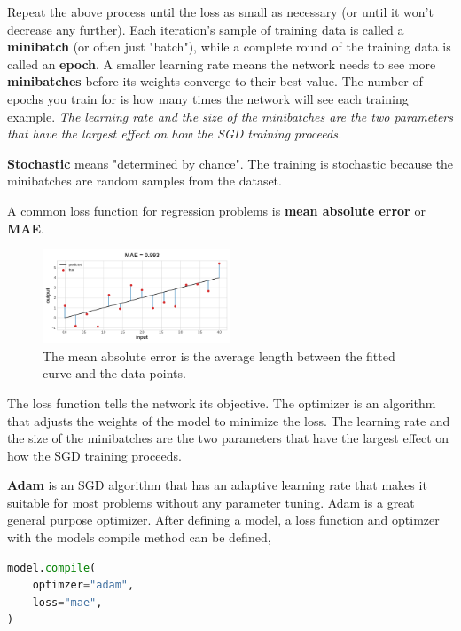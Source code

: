 \noindent Repeat the above process until the loss as small as necessary (or until
it won't decrease any further). Each iteration's sample of training data is called
a \textbf{minibatch} (or often just "batch"), while a complete round of the training data
is called an \textbf{epoch}. A smaller learning rate means the network needs to see
more \textbf{minibatches} before its weights converge to their best value.
The number of epochs you train for is how many times the network will see each
training example. \emph{The learning rate and the size of the minibatches are the two
parameters that have the largest effect on how the SGD training proceeds.}

\noindent \textbf{Stochastic} means "determined by chance". The training is stochastic
because the minibatches are random samples from the dataset.

\noindent A common loss function for regression problems is \textbf{mean absolute
error} or \textbf{MAE}.

\begin{figure}[htp]
	\centering
	\includegraphics[width=0.5\textwidth]{../assets/machine_learning_random/mean_absolute_error.png}
	\caption{The mean absolute error is the average length between the fitted curve and the data points.}
\end{figure}

\noindent The loss function tells the network its objective. The optimizer is an
algorithm that adjusts the weights of the model to minimize the loss. The learning rate
and the size of the minibatches are the two parameters that have the largest effect
on how the SGD training proceeds.

\noindent \textbf{Adam} is an SGD algorithm that has an adaptive learning rate that
makes it suitable for most problems without any parameter tuning. Adam is a great general
purpose optimizer. After defining a model, a loss function and optimzer with the models
compile method can be defined,

\begin{lstlisting}[language=Python]
model.compile(
	optimzer="adam",
	loss="mae",
)
\end{lstlisting}

